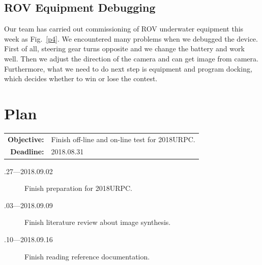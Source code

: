 \documentclass[a4paper]{article}
\begin{document}
	\subsection{ROV Equipment Debugging}
	
	Our team has carried out commissioning of ROV underwater equipment this week as Fig.~\ref{p4}. We encountered many problems when we debugged the device. 	First of all, steering gear turns opposite and we change the battery and work well. Then we adjust the direction of the camera and can get image from camera. Furthermore, what we need to do next step is equipment and program docking, which decides whether to win or lose the contest.
	
	
	
	\section{Plan}
	
	\begin{tabular}{rl}
		\textbf{Objective:} & Finish off-line and on-line test for 2018URPC. \\
		\textbf{Deadline:} & 2018.08.31
	\end{tabular}
	
	\begin{description}
		\item[.27---2018.09.02] Finish preparation for 2018URPC.
		\item[.03---2018.09.09] Finish literature review about image synthesis.
		\item[.10---2018.09.16] Finish reading reference documentation.
	\end{description}
	
	
	
	
	
	
\end{document}

